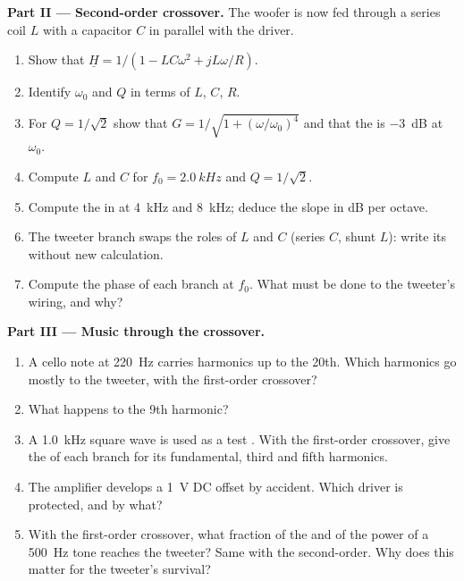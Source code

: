 \begin{problem}
\medskip
\noindent\textbf{Part II --- Second-order crossover.}
The woofer is now fed through a series coil $L$ with a capacitor $C$
in parallel with the driver.
\begin{enumerate}[resume]
  \item Show that $\underline H = 1/(1 - LC\omega^2 + jL\omega/R)$.
  \item Identify $\omega_0$ and $Q$ in terms of $L$, $C$, $R$.
  \item For $Q = 1/\sqrt2$ show that $G = 1/\sqrt{1 + (\omega/\omega_0)^4}$
        and that the  is \qty{-3}{dB} at $\omega_0$.
  \item Compute $L$ and $C$ for $f_0 = \qty{2.0}{kHz}$ and $Q = 1/\sqrt2$.
  \item Compute the  in  at \qty{4}{kHz} and \qty{8}{kHz};
        deduce the slope in dB per octave.
  \item The tweeter branch swaps the roles of $L$ and $C$ (series $C$,
        shunt $L$): write its  without new
        calculation.
  \item Compute the phase of each branch at $f_0$. What must be done to
        the tweeter's wiring, and why?
\end{enumerate}

\medskip
\noindent\textbf{Part III --- Music through the crossover.}
\begin{enumerate}[resume]
  \item A cello note at \qty{220}{Hz} carries harmonics up to the 20th.
        Which harmonics go mostly to the tweeter, with the first-order
        crossover?
  \item What happens to the 9th harmonic?
  \item A \qty{1.0}{kHz} square wave is used as a test . With the
        first-order crossover, give the  of each branch for its
        fundamental, third and fifth harmonics.
  \item The amplifier develops a \qty{1}{V} DC offset by accident. Which
        driver is protected, and by what?
  \item With the first-order crossover, what fraction of the 
        and of the power of a \qty{500}{Hz} tone reaches the tweeter?
        Same with the second-order. Why does this matter for the
        tweeter's survival?
\end{enumerate}


\end{problem}
